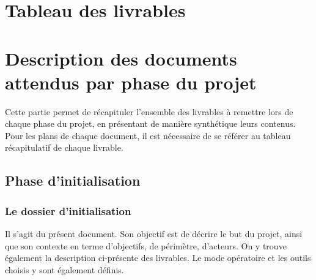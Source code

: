 \let\cleardoublepage\clearpage
\section{Tableau des livrables}

\hspace{-2cm}

\section{Description des documents attendus par phase du projet}

Cette partie permet de récapituler l’ensemble des livrables à remettre lors de chaque phase du projet, en présentant de manière synthétique leurs contenus. \\

Pour les plans de chaque document, il est nécessaire de se référer au tableau récapitulatif de chaque livrable.

\subsection{Phase d’initialisation}

\subsubsection{Le dossier d’initialisation}

Il s’agit du présent document. Son objectif est de décrire le but du projet, ainsi que son contexte en terme d’objectifs, de périmètre, d’acteurs. On y trouve également la description ci-présente des livrables. Le mode opératoire et les outils choisis y sont également définis.  \\

